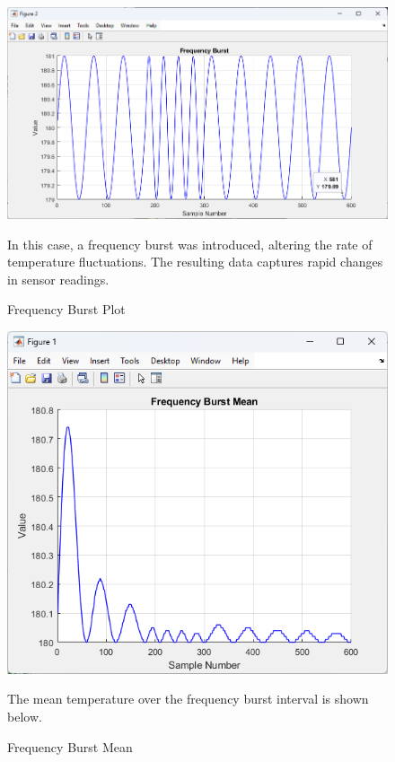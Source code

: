 \documentclass[journal]{IEEEtran}
\begin{document}
\vspace{-1em} %

\begin{figure}[H]
    \centering
    \includegraphics[width=\linewidth]{5.2.1.png}
    \caption{Frequency Burst Plot}
    \begin{minipage}{\linewidth}
      In this case, a frequency burst was introduced, altering the rate of temperature fluctuations. The resulting data captures rapid changes in sensor readings.
    \end{minipage}
    \label{fig:frequency_burst}
\end{figure}

\newpage

\begin{figure}[H]
    \centering
    \includegraphics[width=\linewidth]{5.2.2.png}
    \caption{Frequency Burst Mean}
    \begin{minipage}{\linewidth}
      The mean temperature over the frequency burst interval is shown below.
    \end{minipage}
    \label{fig:frequency_burst_mean}
\end{figure}
\end{document}
